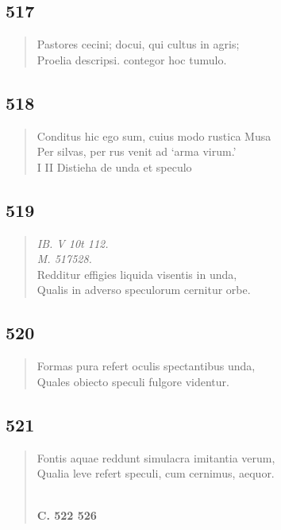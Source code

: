 \documentclass[11pt, a4paper]{report}
\begin{document}
            \subsection*{517}
      \begin{verse}
      Pastores cecini; docui, qui cultus in agris; \\ Proelia descripsi. contegor hoc tumulo. \\ 
      \end{verse}
  
            \subsection*{518}
      \begin{verse}
      Conditus hic ego sum, cuius modo rustica Musa \\ Per silvas, per rus venit ad ‘arma virum.’ \\ I II Distieha de unda et speculo \\ 
      \end{verse}
  
            \subsection*{519}
      \begin{verse}
      \textit{IB. V 10t 112.} \\ \textit{M. 517528.} \\ Redditur effigies liquida visentis in unda, \\ Qualis in adverso speculorum cernitur orbe. \\ 
      \end{verse}
  
            \subsection*{520}
      \begin{verse}
      Formas pura refert oculis spectantibus unda, \\ Quales obiecto speculi fulgore videntur. \\ 
      \end{verse}
  
            \subsection*{521}
      \begin{verse}
      Fontis aquae reddunt simulacra imitantia verum, \\ Qualia leve refert speculi, cum cernimus, aequor. \\ 
        ﻿\pagebreak 
    \begin{center} \textbf{C. 522 526} \end{center} \marginpar{[65]} 
      \end{verse}
  
\end{document}
